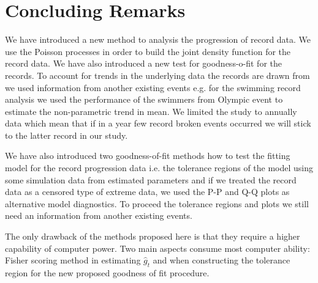 \documentclass[10pt]{article}
\begin{document}




\section{Concluding Remarks}\label{Chap5Sec6}

We have introduced a new method to analysis the progression of record
data.  We use the
Poisson processes in order to build the joint density function for the record
data. We have also introduced a new test for goodness-o-fit for the records. To
account for trends in the underlying data the records are drawn from we
used information from another existing events e.g. for the swimming
record analysis we used the performance of the swimmers from Olympic
event to estimate the non-parametric trend in mean. We limited the
study to annually data which mean that if in a year few record broken
events occurred we will stick to the latter record in our study. 

We have also introduced two goodness-of-fit methods how to test the
fitting model for the record progression data i.e. 
the tolerance regions of the model using some simulation data from
estimated parameters and if we treated the record data as a censored
type of extreme data, we used the P-P and Q-Q
plots as alternative model diagnostics. To proceed the tolerance
regions and plots we still need an information from another existing
events.


The only drawback of the  methods proposed here is that they require a
higher capability of computer power. Two main aspects consume most
computer ability:  Fisher scoring method in estimating $\hat{g}_t$
and when constructing the tolerance region for the new proposed
goodness of fit procedure. 





%

   
\end{document}
